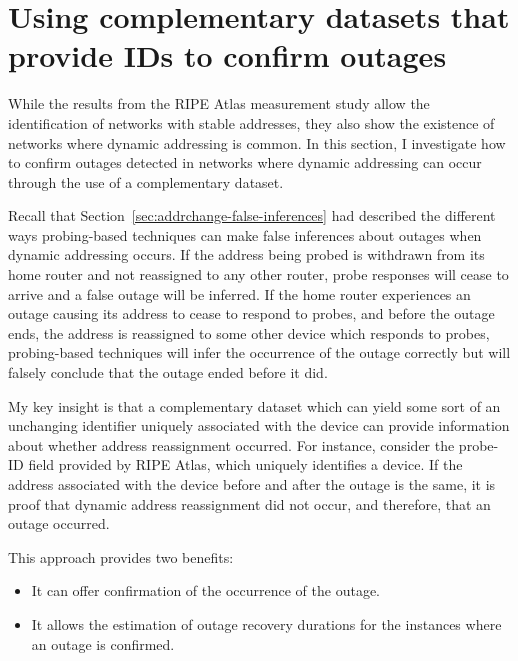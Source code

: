

\section{Using complementary datasets that provide IDs to confirm outages}

While the results from the RIPE Atlas measurement study allow the identification of networks with stable addresses, they also show the existence of networks where dynamic addressing is common. In this section, I investigate how to confirm outages detected in networks where dynamic addressing can occur through the use of a complementary dataset.

Recall that Section~\ref{sec:addrchange-false-inferences} had described the different ways probing-based techniques can make false inferences about outages when dynamic addressing occurs. If the address being probed is withdrawn from its home router and not reassigned to any other router, probe responses will cease to arrive and a false outage will be inferred. If the home router experiences an outage causing its address to cease to respond to probes, and before the outage ends, the address is reassigned to some other device which responds to probes, probing-based techniques will infer the occurrence of the outage correctly but will falsely conclude that the outage ended before it did.

My key insight is that a complementary dataset which can yield some sort of an unchanging identifier uniquely associated with the device can provide information about whether address reassignment occurred. For instance, consider the probe-ID field provided by RIPE Atlas, which uniquely identifies a device. If the address associated with the device before and after the outage is the same, it is proof that dynamic address reassignment did not occur, and therefore, that an outage occurred.

This approach provides two benefits:

\begin{itemize}

\item{It can offer confirmation of the occurrence of the outage.}

\item{It allows the estimation of outage recovery durations for the instances where an outage is confirmed.}

\end{itemize}

